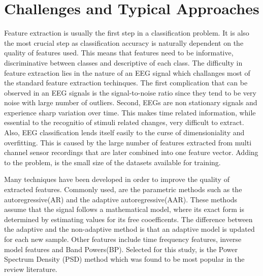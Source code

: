 \documentclass[12pt, a4paper, fleqn]{memoir}%
\begin{document}
\section{Challenges and Typical Approaches}
\label{sec:CommonMethods}
Feature extraction is usually the first step in a classification problem. It is also the most crucial step as classification accuracy is naturally dependent on the quality of features used. This means that features need to be informative, discriminative between classes and descriptive of each class. The difficulty in feature extraction lies in the nature of an EEG signal which challanges most of the standard feature extraction techinques. The first complication that can be observed in an EEG signals is the signal-to-noise ratio since they tend to be very noise with large number of outliers. Second, EEGs are non stationary signals and experience sharp variation over time. This makes time related information, while essential to the recognitio of stimuli related changes, very difficult to extract. Also, EEG classification lends itself easily to the curse of dimensioniality and overfitting. This is caused by the large number of features extracted from multi channel sensor recordings that are later combined into one feature vector. Adding to the problem, is the small size of the datasets available for training\cite{lotte2007review}.

Many techniques have been developed in order to improve the quality of extracted features. Commonly used, are the parametric methods such as the autoregressive(AR) and the adaptive autoregressive(AAR). These methods assume that the signal follows a mathematical model, where its exact form is determined by estimating values for its free cooefficents. The difference between the adaptive and the non-adaptive method is that an adaptive model is updated for each new sample\cite{pardey1996review}. Other features include time frequency features, inverse model features and Band Powers(BP). Selected for this study, is the Power Spectrum Density (PSD) method which was found to be most popular in the review literature.
\end{document}
